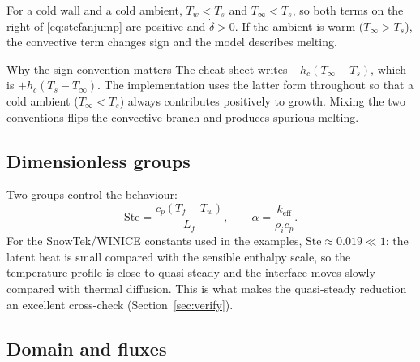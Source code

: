 \documentclass[11pt,a4paper]{article}
\newcommand{\Ts}{T_s}
\newcommand{\Tw}{T_w}
\newcommand{\Tinf}{T_\infty}
\newcommand{\Tf}{T_f}
\newcommand{\Lf}{L_f}
\newcommand{\keff}{k_{\mathrm{eff}}}
\begin{document}
For a cold wall and a cold ambient, $\Tw<\Ts$ and $\Tinf<\Ts$, so both terms on the
right of \eqref{eq:stefanjump} are positive and $\dot\delta>0$. If the ambient is warm
($\Tinf>\Ts$), the convective term changes sign and the model describes melting.

\begin{insightbox}{Why the sign convention matters}
The cheat-sheet writes $-h_c(\Tinf-\Ts)$, which is $+h_c(\Ts-\Tinf)$. The implementation
uses the latter form throughout so that a cold ambient ($\Tinf<\Ts$) always contributes
positively to growth. Mixing the two conventions flips the convective branch and produces
spurious melting.
\end{insightbox}

\subsection{Dimensionless groups}

Two groups control the behaviour:
\begin{equation}
  \mathrm{Ste}=\frac{c_p(\Tf-\Tw)}{\Lf},
  \qquad
  \alpha=\frac{\keff}{\rho_i c_p}.
\end{equation}
For the SnowTek/WINICE constants used in the examples,
$\mathrm{Ste}\approx0.019\ll1$: the latent heat is small compared with the sensible
enthalpy scale, so the temperature profile is close to quasi-steady and the interface
moves slowly compared with thermal diffusion. This is what makes the quasi-steady
reduction an excellent cross-check (Section~\ref{sec:verify}).

\subsection{Domain and fluxes}
\end{document}
